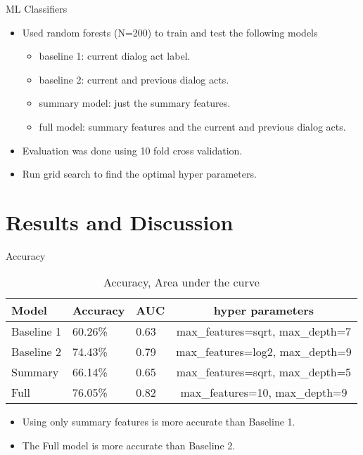\begin{frame}{ML Classifiers}
  \begin{itemize}
  \item Used random forests (N=200) to train and test the following models
  \begin{itemize}
    \item baseline 1: current dialog act label.
    \item baseline 2: current and previous dialog acts.
    \item summary model: just the summary features.
    \item full model: summary features and the current and previous dialog acts.
  \end{itemize}
  \item Evaluation was done using 10 fold cross validation.
  \item Run grid search to find the optimal hyper parameters.
  \end{itemize}
\end{frame}

\section{Results and Discussion}
\frame{\sectionpage}

\begin{frame}{Accuracy}
\begin{table}
\begin{center}
 \begin{tabular}{| l | l | l | c |}
    \hline
    Model & Accuracy & AUC & hyper parameters\\
    \hline
    Baseline 1      & 60.26\% & 0.63 & \scriptsize{max\_features=sqrt, max\_depth=7} \\
    Baseline 2     & 74.43\% & 0.79 & \scriptsize{max\_features=log2, max\_depth=9}\\
    Summary        & 66.14\% & 0.65 & \scriptsize{max\_features=sqrt, max\_depth=5} \\
    Full           & 76.05\% & 0.82 &\scriptsize{ max\_features=10, max\_depth=9}\\
  \hline
\end{tabular}
\end{center}
\caption{Accuracy, Area under the curve }
\end{table}
\begin{itemize}
\item Using only summary features is more accurate than Baseline 1.
\item The Full model is more accurate than Baseline 2.
\end{itemize}

\end{frame}

